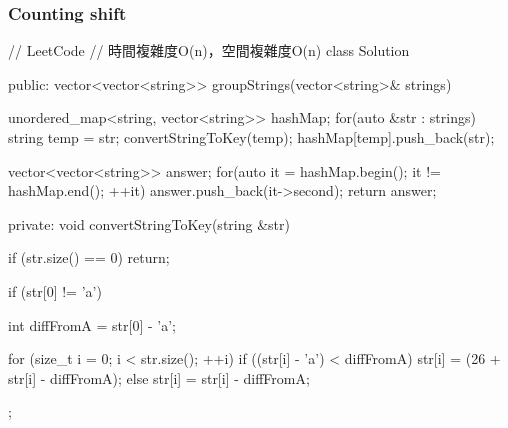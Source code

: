 \subsubsection{Counting shift}
\begin{Code}
// LeetCode
// 時間複雜度O(n)，空間複雜度O(n)
class Solution {
public:
    vector<vector<string>> groupStrings(vector<string>& strings) {
        unordered_map<string, vector<string>> hashMap;
        for(auto &str : strings) {
            string temp = str;
            convertStringToKey(temp);
            hashMap[temp].push_back(str);
        }

        vector<vector<string>> answer;
        for(auto it = hashMap.begin(); it != hashMap.end(); ++it) {
            answer.push_back(it->second);
        }
        return answer;
    }
private:
    void convertStringToKey(string &str) {
        if (str.size() == 0) return;

        if (str[0] != 'a')
        {
            int diffFromA = str[0] - 'a';

            for (size_t i = 0; i < str.size(); ++i)
            {
                if ((str[i] - 'a') < diffFromA)
                    str[i] = (26 + str[i] - diffFromA);
                else
                    str[i] = str[i] - diffFromA;
            }
        }
    }
};
\end{Code}
